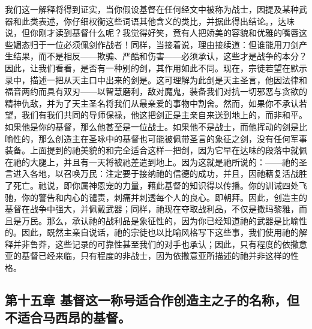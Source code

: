 我们这一解释将得到证实，当你假设基督在任何经文中被称为战士，因提及某种武器和此类表述，你仔细权衡这些词语其他含义的类比，并据此得出结论。，达味说，但你刚才读到基督什么呢？我觉得好笑，竟有人把娇美的容貌和优雅的嘴唇这些媚态归于一位必须佩剑作战者！同样，当接着说，理由接续道：但谁能用刀剑产生结果，而不是相反——欺骗、严酷和伤害——必须承认，这些才是战争的本分？因此，让我们看看，是否有一种别的剑，其作用如此不同。现在，宗徒若望在默示录中，描述一把从天主口中出来的剑是。这可理解为此剑是天主圣言，他因法律和福音两约而具有双刃——以智慧磨利，敌对魔鬼，装备我们对抗一切邪恶与贪欲的精神仇敌，并为了天主圣名将我们从最亲爱的事物中割舍。然而，如果你不承认若望，我们有我们共同的导师保禄，他这把剑正是主亲自来送到地上的，而非和平。如果他是你的基督，那么他甚至是一位战士。如果他不是战士，而他挥动的剑是比喻性的，那么创造主在圣咏中的基督也可能被佩带圣言的象征之剑，没有任何军事装备。上面提到的祂美貌的和完全适合这样一把剑，因为它早在达味的段落中就佩在祂的大腿上，并且有一天将被祂差遣到地上。因为这就是祂所说的：——祂的圣言进入各地，以召唤万民：注定要于接纳祂的信德的成功，并且，因祂藉复活战胜了死亡。祂说，即你属神恩宠的力量，藉此基督的知识得以传播。你的训诫四处飞驰，你的警告和内心的谴责，刺痛并刺透每个人的良心。即朝拜。因此，创造主的基督在战争中强大，并佩戴武器；同样，祂现在夺取战利品，不仅是撒玛黎雅，而且是万民。那么，承认祂的战利品是象征性的，因为你已经知道祂的武器是比喻性的。因此，既然主亲自说话，祂的宗徒也以比喻风格写下这些事，我们使用祂的解释并非鲁莽，这些记录的可靠性甚至我们的对手也承认；因此，只有程度的依撒意亚的基督已经来临，只有程度的非战士，因为依撒意亚所描述的祂并非这样的性格。\par


\subsection{第十五章 基督这一称号适合作创造主之子的名称，但不适合马西昂的基督。}

